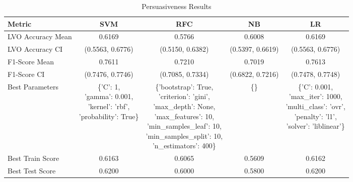 \begin{table}[h!]
\centering
\begin{tabular}{|l|c|c|c|c|}
\hline
\textbf{Metric}           & \textbf{SVM}    & \textbf{RFC}    & \textbf{NB}     & \textbf{LR}     \\ \hline
LVO Accuracy Mean         & 0.6169          & 0.5766          & 0.6008          & 0.6169          \\ \hline
LVO Accuracy CI           & (0.5563, 0.6776)& (0.5150, 0.6382)& (0.5397, 0.6619)& (0.5563, 0.6776)\\ \hline
F1-Score Mean             & 0.7611          & 0.7210          & 0.7019          & 0.7613          \\ \hline
F1-Score CI               & (0.7476, 0.7746)& (0.7085, 0.7334)& (0.6822, 0.7216)& (0.7478, 0.7748)\\ \hline
Best Parameters           & \makecell[l]{\{'C': 1,\\ 'gamma': 0.001,\\ 'kernel': 'rbf',\\ 'probability': True\}} & \makecell[l]{\{'bootstrap': True,\\ 'criterion': 'gini',\\ 'max\_depth': None,\\ 'max\_features': 10,\\ 'min\_samples\_leaf': 10,\\ 'min\_samples\_split': 10,\\ 'n\_estimators': 400\}} & \{\} & \makecell[l]{\{'C': 0.001,\\ 'max\_iter': 1000,\\ 'multi\_class': 'ovr',\\ 'penalty': 'l1',\\ 'solver': 'liblinear'\}} \\ \hline
Best Train Score          & 0.6163          & 0.6065          & 0.5609          & 0.6162          \\ \hline
Best Test Score           & 0.6200          & 0.6000          & 0.5800          & 0.6200          \\ \hline
\end{tabular}
\caption{Persuasiveness Results}
\label{table:persuasiveness}
\end{table}
